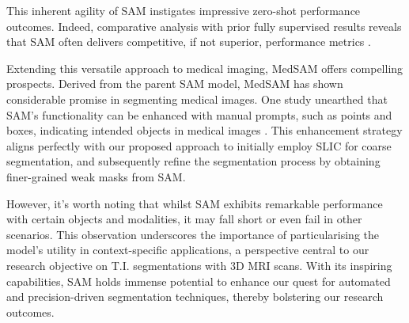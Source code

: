 This inherent agility of SAM instigates impressive zero-shot performance outcomes. Indeed, comparative analysis with prior fully supervised results reveals that SAM often delivers competitive, if not superior, performance metrics \cite{kirillov2023segany}.

Extending this versatile approach to medical imaging, MedSAM \cite{MedSAM} offers compelling prospects. Derived from the parent SAM model, MedSAM has shown considerable promise in segmenting medical images. One study unearthed that SAM's functionality can be enhanced with manual prompts, such as points and boxes, indicating intended objects in medical images \cite{huang2023segment}. This enhancement strategy aligns perfectly with our proposed approach to initially employ SLIC for coarse segmentation, and subsequently refine the segmentation process by obtaining finer-grained weak masks from SAM.

However, it's worth noting that whilst SAM exhibits remarkable performance with certain objects and modalities, it may fall short or even fail in other scenarios. This observation underscores the importance of particularising the model's utility in context-specific applications, a perspective central to our research objective on T.I. segmentations with 3D MRI scans. With its inspiring capabilities, SAM holds immense potential to enhance our quest for automated and precision-driven segmentation techniques, thereby bolstering our research outcomes.












